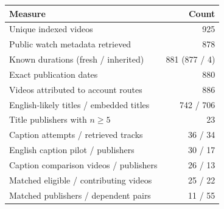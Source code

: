 \begin{tabular}{@{}lr@{}}
\toprule
Measure & Count \\
\midrule
Unique indexed videos & 925 \\
Public watch metadata retrieved & 878 \\
Known durations (fresh / inherited) & 881 (877 / 4) \\
Exact publication dates & 880 \\
Videos attributed to account routes & 886 \\
English-likely titles / embedded titles & 742 / 706 \\
Title publishers with $n\geq5$ & 23 \\
Caption attempts / retrieved tracks & 36 / 34 \\
English caption pilot / publishers & 30 / 17 \\
Caption comparison videos / publishers & 26 / 13 \\
Matched eligible / contributing videos & 25 / 22 \\
Matched publishers / dependent pairs & 11 / 55 \\
\bottomrule
\end{tabular}
